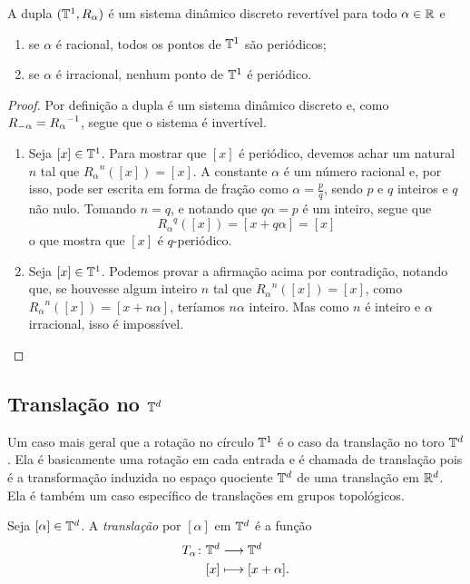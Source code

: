 \begin{proposition}
A dupla $(\mathbb{T}^1,R_\alpha)$ é um sistema dinâmico discreto revertível para todo $\alpha \in \mathbb{R}$ e
	\begin{enumerate}
	\item se $\alpha$ é racional, todos os pontos de $\mathbb{T}^1$ são periódicos;
	\item se $\alpha$ é irracional, nenhum ponto de $\mathbb{T}^1$ é periódico.
	\end{enumerate}
\end{proposition}
\begin{proof}
Por definição a dupla é um sistema dinâmico discreto e, como $R_{-\alpha}={R_\alpha}^{-1}$, segue que o sistema é invertível.
	\begin{enumerate}
	\item Seja $[x] \in \mathbb{T}^1$. Para mostrar que $[x]$ é periódico, devemos achar um natural $n$ tal que ${R_\alpha}^n([x]) = [x]$. A constante $\alpha$ é um número racional e, por isso, pode ser escrita em forma de fração como $\alpha = \frac{p}{q}$, sendo $p$ e $q$ inteiros e $q$ não nulo. Tomando $n = q$, e notando que $q\alpha=p$ é um inteiro, segue que
	\begin{equation*}
	{R_\alpha}^q([x]) = [x+q\alpha] = [x]
	\end{equation*}
o que mostra que $[x]$ é $q$-periódico.

	\item Seja $[x] \in \mathbb{T}^1$. Podemos provar a afirmação acima por contradição, notando que, se houvesse algum inteiro $n$ tal que ${R_\alpha}^n([x]) = [x]$, como ${R_\alpha}^n([x]) = [x + n\alpha]$, teríamos $n\alpha$ inteiro. Mas como $n$ é inteiro e $\alpha$ irracional, isso é impossível.
	\qedhere
	\end{enumerate}
\end{proof}

\subsection{Translação no \texorpdfstring{$\mathbb{T}^d$}{toro d dimensional}}

Um caso mais geral que a rotação no círculo $\mathbb{T}^1$ é o caso da translação no toro $\mathbb{T}^d$. Ela é basicamente uma rotação em cada entrada e é chamada de translação pois é a transformação induzida no espaço quociente $\mathbb{T}^d$ de uma translação em $\mathbb{R}^d$. Ela é também um caso específico de translações em grupos topológicos.

\begin{definition}
Seja $[\alpha] \in \mathbb{T}^d$. A \emph{translação} por $[\alpha]$ em $\mathbb{T}^d$ é a função
	\begin{align*}
	{T_\alpha}\colon {\mathbb{T}^d} &\longrightarrow {\mathbb{T}^d} \\{[x]} &\longmapsto [x+\alpha].
	\end{align*}
\end{definition}


